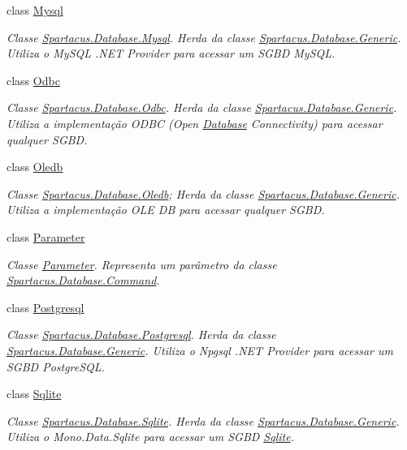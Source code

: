 \begin{DoxyCompactItemize}
class \hyperlink{classSpartacus_1_1Database_1_1Mysql}{Mysql}
\begin{DoxyCompactList}\small\item\em Classe \hyperlink{classSpartacus_1_1Database_1_1Mysql}{Spartacus.\+Database.\+Mysql}. Herda da classe \hyperlink{classSpartacus_1_1Database_1_1Generic}{Spartacus.\+Database.\+Generic}. Utiliza o My\+S\+Q\+L .N\+E\+T Provider para acessar um S\+G\+B\+D My\+S\+Q\+L. \end{DoxyCompactList}\item 
class \hyperlink{classSpartacus_1_1Database_1_1Odbc}{Odbc}
\begin{DoxyCompactList}\small\item\em Classe \hyperlink{classSpartacus_1_1Database_1_1Odbc}{Spartacus.\+Database.\+Odbc}. Herda da classe \hyperlink{classSpartacus_1_1Database_1_1Generic}{Spartacus.\+Database.\+Generic}. Utiliza a implementação O\+D\+B\+C (Open \hyperlink{namespaceSpartacus_1_1Database}{Database} Connectivity) para acessar qualquer S\+G\+B\+D. \end{DoxyCompactList}\item 
class \hyperlink{classSpartacus_1_1Database_1_1Oledb}{Oledb}
\begin{DoxyCompactList}\small\item\em Classe \hyperlink{classSpartacus_1_1Database_1_1Oledb}{Spartacus.\+Database.\+Oledb}; Herda da classe \hyperlink{classSpartacus_1_1Database_1_1Generic}{Spartacus.\+Database.\+Generic}. Utiliza a implementação O\+L\+E D\+B para acessar qualquer S\+G\+B\+D. \end{DoxyCompactList}\item 
class \hyperlink{classSpartacus_1_1Database_1_1Parameter}{Parameter}
\begin{DoxyCompactList}\small\item\em Classe \hyperlink{classSpartacus_1_1Database_1_1Parameter}{Parameter}. Representa um parâmetro da classe \hyperlink{classSpartacus_1_1Database_1_1Command}{Spartacus.\+Database.\+Command}. \end{DoxyCompactList}\item 
class \hyperlink{classSpartacus_1_1Database_1_1Postgresql}{Postgresql}
\begin{DoxyCompactList}\small\item\em Classe \hyperlink{classSpartacus_1_1Database_1_1Postgresql}{Spartacus.\+Database.\+Postgresql}. Herda da classe \hyperlink{classSpartacus_1_1Database_1_1Generic}{Spartacus.\+Database.\+Generic}. Utiliza o Npgsql .N\+E\+T Provider para acessar um S\+G\+B\+D Postgre\+S\+Q\+L. \end{DoxyCompactList}\item 
class \hyperlink{classSpartacus_1_1Database_1_1Sqlite}{Sqlite}
\begin{DoxyCompactList}\small\item\em Classe \hyperlink{classSpartacus_1_1Database_1_1Sqlite}{Spartacus.\+Database.\+Sqlite}. Herda da classe \hyperlink{classSpartacus_1_1Database_1_1Generic}{Spartacus.\+Database.\+Generic}. Utiliza o Mono.\+Data.\+Sqlite para acessar um S\+G\+B\+D \hyperlink{classSpartacus_1_1Database_1_1Sqlite}{Sqlite}. \end{DoxyCompactList}\end{DoxyCompactItemize}
